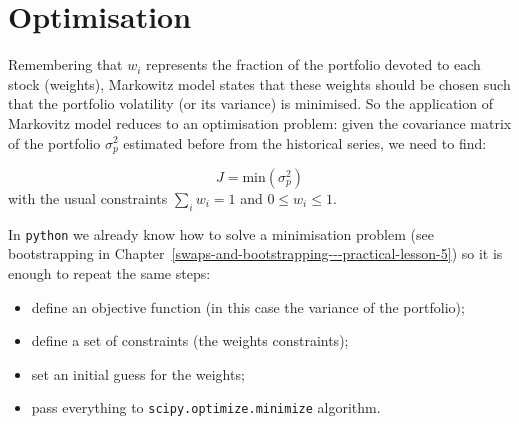 \section{Optimisation}\label{optimization}

Remembering that \(w_i\) represents the fraction of the portfolio
devoted to each stock (weights), Markowitz model states that these
weights should be chosen such that the portfolio volatility (or its
variance) is minimised. So the application of Markovitz model reduces to
an optimisation problem: given the covariance matrix of the portfolio
\(\sigma_p^2\) estimated before from the historical series, we need to find:

\[ J = \textrm{min}(\sigma_p^2) \]
with the usual constraints \(\sum_{i}w_i = 1\) and \(0 \le w_i \le 1\).

In \texttt{python} we already know how to solve a minimisation problem
(see bootstrapping in Chapter~\ref{swaps-and-bootstrapping---practical-lesson-5}) so it is enough to repeat the same steps:

\begin{itemize}
\tightlist
\item
  define an objective function (in this case the variance of the
  portfolio);
\item
  define a set of constraints (the weights constraints);
\item
  set an initial guess for the weights;
\item
  pass everything to \texttt{scipy.optimize.minimize} algorithm.
\end{itemize}

